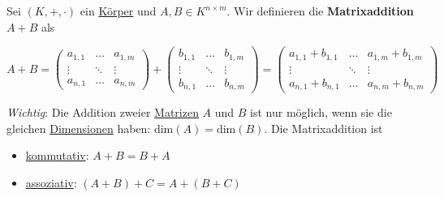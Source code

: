 \documentclass[../../main.tex]{subfiles}
\begin{document}
	\begin{definition}[Matrixaddition]
		\label{def:Matrixaddition}
		Sei $(K,+,\cdot)$ ein \hyperref[def:Körper]{Körper} und $A,B\in K^{n\times m}$. Wir definieren die \textbf{Matrixaddition} $A+B$ als
		
		$$
		A+B = 
		\begin{pmatrix}
			a_{1,1} & \dots & a_{1,m} \\
			\vdots  & \ddots & \vdots \\
			a_{n,1} & \dots & a_{n,m}
		\end{pmatrix}
		+
		\begin{pmatrix}
			b_{1,1} & \dots & b_{1,m} \\
			\vdots  & \ddots & \vdots \\
			b_{n,1} & \dots & b_{n,m}
		\end{pmatrix}
		=
		\begin{pmatrix}
			a_{1,1}+b_{1,1} & \dots & a_{1,m}+b_{1,m} \\
			\vdots  & \ddots & \vdots \\
			a_{n,1}+b_{n,1} & \dots & a_{n,m}+b_{n,m}
		\end{pmatrix}
		$$
		
		\textit{Wichtig}: Die Addition zweier \hyperref[def:Matrix]{Matrizen} $A$ und $B$ ist nur möglich, wenn sie die gleichen \hyperref[def:DimensionMatrix]{Dimensionen} haben: $\textrm{dim}(A) = \textrm{dim}(B)$. Die Matrixaddition ist 
		\begin{itemize}
			\item \hyperref[def:kommutativ]{kommutativ}: $A+B = B+A$
			\item \hyperref[def:assoziativ]{assoziativ}: $(A+B)+C = A+(B+C)$
		\end{itemize}
	\end{definition}
\end{document}
